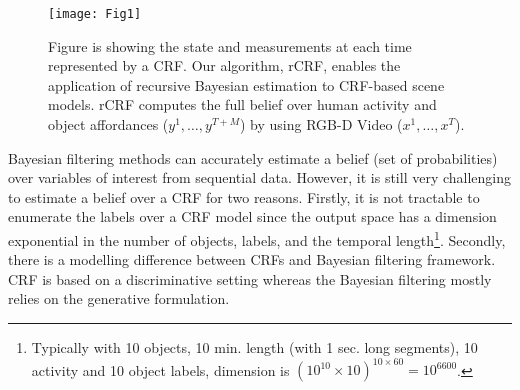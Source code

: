 




\begin{figure}[t]
\texttt{[image: Fig1]}
\caption{Figure is showing the state and measurements at each time represented by a CRF.
Our algorithm, rCRF, enables the application of recursive Bayesian estimation to CRF-based scene models. rCRF computes the full belief over human activity and object affordances ($y^1,\ldots,y^{T+M}$) by using RGB-D Video ($x^1,\ldots,x^T$).}
\label{fig1}
\end{figure}

Bayesian filtering methods can accurately estimate a belief (set of probabilities) over variables of interest from sequential data. However, it is still very challenging to estimate a belief over a CRF for two reasons. Firstly, it is not tractable to enumerate the labels over a CRF model since the output space has a dimension exponential in the number of objects, labels, and the temporal length\footnote{Typically with 10 objects, 10 min. length (with 1 sec. long segments), 10 activity and 10 object labels, dimension is $(10^{10}\times10)^{10\times60}=10^{6600}$.}. Secondly, there is a modelling difference between CRFs and Bayesian filtering framework. CRF is based on a discriminative setting whereas the Bayesian filtering mostly relies on the generative formulation.

